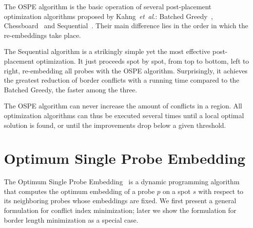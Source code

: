\documentclass[runningheads]{llncs}
\newcommand{\ignore}[1]{}
\begin{document}
The OSPE algorithm is the basic operation of several post-placement optimization
algorithms proposed by Kahng~{\it et~al}.: Batched Greedy~\cite{KAHNG02},
Chessboard~\cite{KAHNG02} and Sequential~\cite{KAHNG03B}. Their main difference lies in
the order in which the re-embeddings take place.

\ignore{
The first algorithm is a simple greedy approach that computes, for each spot of the chip,
the maximum reduction of conflicts that could be achieved by re-embedding its probe with
the OSPE algorithm. It then greedily selects the spot with higher gain and re-embeds
its probe optimally with respect to its neighbors, updating the gains of affected
spots. A faster version, called Batched Greedy, sacrifices its greedy nature by postponing
the update of gains and re-embedding all probes that have not been affected by the
re-embeddings performed in the current iteration.

The Chessboard optimization is based on the fact that a chip can be bi-colored
just like a chessboard, in such a way that the embeddings of probes located on
white spots, with respect to border length, are independent of those placed on black spots,
and vice-versa. The Chessboard uses this coloring to alternate the optimal re-embedding
of probes located on black and white spots.
}

The Sequential algorithm is a strikingly simple yet the most effective post-placement
optimization. It just proceeds spot by spot, from top to bottom, left to right,
re-embedding all probes with the OSPE algorithm. Surprisingly, it achieves the greatest
reduction of border conflicts with a running time compared to the Batched Greedy,
the faster among the three.

The OSPE algorithm can never increase the amount of conflicts in a region.
All optimization algorithms can thus be executed several times until
a local optimal solution is found, or until the improvements drop below a given threshold.

\section{Optimum Single Probe Embedding}
\label{sec:ospe}

The Optimum Single Probe Embedding~\cite{KAHNG02} is a dynamic programming
algorithm that computes the optimum embedding of a probe $p$ on a spot $s$
with respect to its neighboring probes whose embeddings are fixed. We first present
a general formulation for conflict index minimization; later we show the
formulation for border length minimization as a special case.
\end{document}
